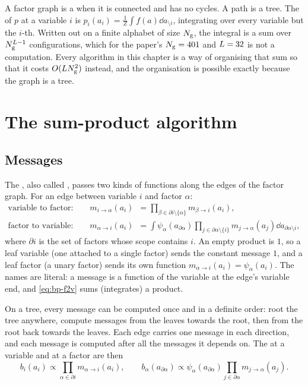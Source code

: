 A factor graph is a  when it is connected and has no cycles. A path is a
tree. The  of $p$ at a variable $i$ is
$p_i(a_i)=\frac1Z\int f(a)\dd a_{\setminus i}$, integrating over every variable but the
$i$-th. Written out on a finite alphabet of size $N_{\mathrm{g}}$, the integral is a sum over
$N_{\mathrm{g}}^{L-1}$ configurations, which for the paper's $N_{\mathrm{g}}=401$ and $L=32$
is not a computation. Every algorithm in this chapter is a way of organising that sum
so that it costs $O(LN_{\mathrm{g}}^2)$ instead, and the organisation is possible exactly
because the graph is a tree.

\section{The sum-product algorithm}

\subsection{Messages}

The , also called , passes two
kinds of functions along the edges of the factor graph. For an edge between variable
$i$ and factor $\alpha$:
\begin{align}
  \text{variable to factor:}\qquad
  m_{i\to\alpha}(a_i)&=\prod_{\beta\in\partial i\setminus\{\alpha\}} m_{\beta\to i}(a_i),
  \label{eq:bp-v2f}\\
  \text{factor to variable:}\qquad
  m_{\alpha\to i}(a_i)&=\int\psi_\alpha(a_{\partial\alpha})
    \prod_{j\in\partial\alpha\setminus\{i\}} m_{j\to\alpha}(a_j)\dd a_{\partial\alpha\setminus i},
  \label{eq:bp-f2v}
\end{align}
where $\partial i$ is the set of factors whose scope contains $i$. An empty product is
$1$, so a leaf variable (one attached to a single factor) sends the constant message
$1$, and a leaf factor (a unary factor) sends its own function
$m_{\alpha\to i}(a_i)=\psi_\alpha(a_i)$. The names are literal: a message is a function
of the variable at the edge's variable end, and \cref{eq:bp-f2v} sums (integrates) a
product.

On a tree, every message can be computed once and in a definite order: root the tree
anywhere, compute messages from the leaves towards the root, then from the root back
towards the leaves. Each edge carries one message in each direction, and each message
is computed after all the messages it depends on. The  at a variable and at
a factor are then
\begin{equation}
  b_i(a_i)\propto\prod_{\alpha\in\partial i} m_{\alpha\to i}(a_i),\qquad
  b_\alpha(a_{\partial\alpha})\propto\psi_\alpha(a_{\partial\alpha})
   \prod_{j\in\partial\alpha} m_{j\to\alpha}(a_j).
  \label{eq:bp-beliefs}
\end{equation}

